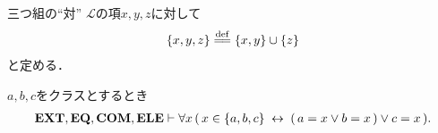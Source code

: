 	\begin{itembox}[l]{三つ組の``対''}
		$\mathcal{L}$の項$x,y,z$に対して
		\begin{align}
			\{x,y,z\} \defeq \{x,y\} \cup \{z\}
		\end{align}
		と定める．
	\end{itembox}
	
	\begin{screen}
		\begin{thm}[三つ組も表示されている要素しか持たない]
		\label{thm:triple_members_are_exactly_the_given_three}
			$a,b,c$をクラスとするとき
			\begin{align}
				\mbox{{\bf EXT}},\mbox{{\bf EQ}},\mbox{\bf COM},\mbox{{\bf ELE}} \vdash 
				\forall x\, (\, x \in \{a,b,c\} \hspace{0.25em}\leftrightarrow\hspace{0.25em} 
				(\, a = x \vee b = x\, ) \vee c = x\, ).
			\end{align}
		\end{thm}
	\end{screen}
	

